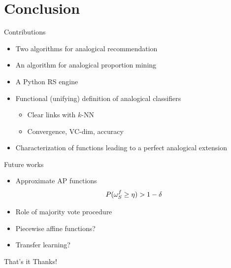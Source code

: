 \documentclass{beamer}
\begin{document}
\section*{Conclusion}

\begin{frame}{Contributions}
  \begin{itemize}
    \item Two algorithms for analogical recommendation \cite{HugPraRicISMIS15,
      HugPraRicSerFuzzIEEE16}
    \item An algorithm for analogical proportion mining
      \cite{HugPraRicSerLFA16}
    \item A Python RS engine \cite{Surprise}
    \item Functional (unifying) definition of analogical classifiers
      \cite{HugPraRicSerECAI16}
      \begin{itemize}
        \item Clear links with $k$-NN
        \item Convergence, VC-dim, accuracy
      \end{itemize}
    \item Characterization of functions leading to a perfect analogical
      extension \cite{CouHugPraRicIJCAI17}
  \end{itemize}
\end{frame}

\begin{frame}{Future works}
  \begin{itemize}
    \item Approximate AP functions
      $$P(\omega_{S}^{f} \geq \eta) > 1 - \delta$$
    \item Role of majority vote procedure
    \item Piecewise affine functions?
    \item Transfer learning?
  \end{itemize}
\end{frame}

\begin{frame}{That's it}
    Thanks!
\end{frame}



\end{document}
